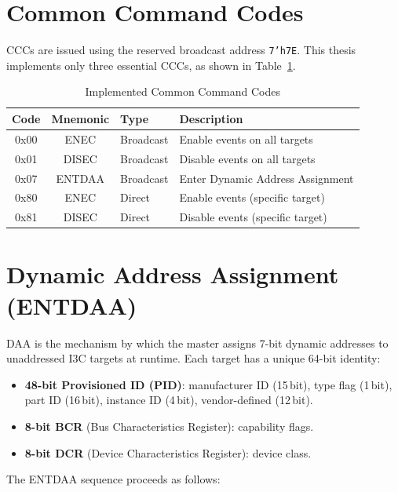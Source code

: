 \documentclass[12pt, a4paper, oneside]{report}
\newcommand{\signal}[1]{\texttt{#1}}
\begin{document}
\section{Common Command Codes}

CCCs are issued using the reserved broadcast address \signal{7'h7E}. This thesis
implements only three essential CCCs, as shown in Table~\ref{tab:cccs}.

\begin{table}[H]
\centering
\caption{Implemented Common Command Codes}
\label{tab:cccs}
\begin{tabular}{ccll}
\toprule
\textbf{Code} & \textbf{Mnemonic} & \textbf{Type} & \textbf{Description} \\
\midrule
0x00 & ENEC   & Broadcast & Enable events on all targets \\
0x01 & DISEC  & Broadcast & Disable events on all targets \\
0x07 & ENTDAA & Broadcast & Enter Dynamic Address Assignment \\
0x80 & ENEC   & Direct    & Enable events (specific target) \\
0x81 & DISEC  & Direct    & Disable events (specific target) \\
\bottomrule
\end{tabular}
\end{table}

\section{Dynamic Address Assignment (ENTDAA)}

DAA is the mechanism by which the master assigns 7-bit dynamic addresses to unaddressed
I3C targets at runtime. Each target has a unique 64-bit identity:
\begin{itemize}
  \item \textbf{48-bit Provisioned ID (PID)}: manufacturer ID (15\,bit), type flag
        (1\,bit), part ID (16\,bit), instance ID (4\,bit), vendor-defined (12\,bit).
  \item \textbf{8-bit BCR} (Bus Characteristics Register): capability flags.
  \item \textbf{8-bit DCR} (Device Characteristics Register): device class.
\end{itemize}

The ENTDAA sequence proceeds as follows:
\end{document}
